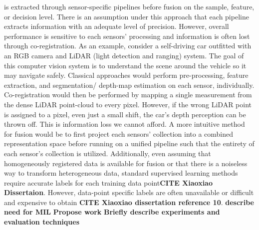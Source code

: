 \newpage is extracted through sensor-specific pipelines before fusion on the sample, feature, or decision level.  There is an assumption under this approach that each pipeline extracts information with an adequate level of precision.  However, overall performance is sensitive to each sensors' processing and information is often lost through co-registration.  As an example, consider a self-driving car outfitted with an RGB camera and LiDAR (light detection and ranging) system. The goal of this computer vision system is to understand the scene around the vehicle so it may navigate safely.  Classical approaches would perform pre-processing, feature extraction, and segmentation/ depth-map estimation on each sensor, individually.  Co-registration would then be performed by mapping a single measurement from the dense LiDAR point-cloud to every pixel.  However, if the wrong LiDAR point is assigned to a pixel, even just a small shift, the car's depth perception can be thrown off.  This is information loss we cannot afford.  A more intuitive method for fusion would be to first project each sensors' collection into a combined representation space before running on a unified pipeline such that the entirety of each sensor's collection is utilized. 
\newline
Additionally, even assuming that homogeneously registered data is available for fusion or that there is a noiseless way to transform heterogeneous  data, standard supervised learning methods require accurate labels for each training data point\textbf{CITE Xiaoxiao Dissertaion}.  However, data-point specific labels are often unavailable or difficult and expensive to obtain \textbf{CITE Xiaoxiao dissertation reference 10}. 
\textbf{describe need for MIL}
\newline
\textbf{Propose work}
\newline
\textbf{Briefly describe experiments and evaluation techniques}
